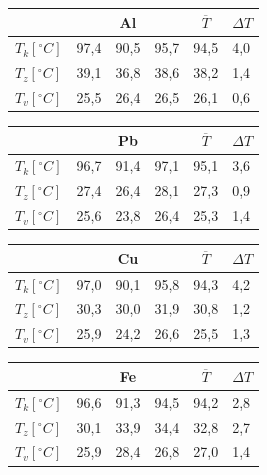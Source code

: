 \documentclass[a4paper]{article}
\begin{document}
\begin{multicols}{2}

\begin{table}[H]
\centering
\renewcommand{\arraystretch}{1.5}
\begin{tabular}{llllll}
   & & \multicolumn{1}{c}{Al} & & \multicolumn{1}{c}{$\overline{T}$} & \multicolumn{1}{c}{$\Delta T$} \\
   \hline
$T_k [^\circ C]$ & 97,4     & 90,5    & 95,7    & 94,5                    & 4,0                     \\
\hline
$T_z [^\circ C]$ & 39,1     & 36,8    & 38,6    & 38,2                    & 1,4                     \\
\hline
$T_v [^\circ C]$ & 25,5     & 26,4    & 26,5    & 26,1                    & 0,6 \\
\hline
\end{tabular}
\end{table}

\begin{table}[H]
\centering
\renewcommand{\arraystretch}{1.5}
\begin{tabular}{llllll}
   & & \multicolumn{1}{c}{Pb} & & \multicolumn{1}{c}{$\overline{T}$} & \multicolumn{1}{c}{$\Delta T$} \\
   \hline
$T_k [^\circ C]$ & 96,7 & 91,4 & 97,1 & 95,1 & 3,6 \\
\hline
$T_z [^\circ C]$ & 27,4 & 26,4 & 28,1 & 27,3 & 0,9 \\
\hline
$T_v [^\circ C]$ & 25,6 & 23,8 & 26,4 & 25,3 & 1,4 \\
\hline
\end{tabular}
\end{table}

\columnbreak

\begin{table}[H]
\centering
\renewcommand{\arraystretch}{1.5}
\begin{tabular}{llllll}
   & & \multicolumn{1}{c}{Cu} & & \multicolumn{1}{c}{$\overline{T}$} & \multicolumn{1}{c}{$\Delta T$} \\
   \hline
$T_k [^\circ C]$ & 97,0 & 90,1 & 95,8 & 94,3 & 4,2 \\
\hline
$T_z [^\circ C]$ & 30,3 & 30,0 & 31,9 & 30,8 & 1,2 \\
\hline
$T_v [^\circ C]$ & 25,9 & 24,2 & 26,6 & 25,5 & 1,3 \\
\hline
\end{tabular}
\end{table}

\begin{table}[H]
\centering
\renewcommand{\arraystretch}{1.5}
\begin{tabular}{llllll}
   & & \multicolumn{1}{c}{Fe} & & \multicolumn{1}{c}{$\overline{T}$} & \multicolumn{1}{c}{$\Delta T$} \\
   \hline
$T_k [^\circ C]$ & 96,6 & 91,3 & 94,5 & 94,2 & 2,8 \\
\hline
$T_z [^\circ C]$ & 30,1 & 33,9 & 34,4 & 32,8 & 2,7 \\
\hline
$T_v [^\circ C]$ & 25,9 & 28,4 & 26,8 & 27,0 & 1,4 \\
\hline
\end{tabular}
\end{table}


\end{multicols}
\end{document}
